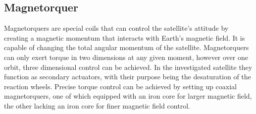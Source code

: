 \subsection{Magnetorquer}

Magnetorquers are special coils that can control the satellite's attitude by creating a magnetic momentum that interacts with Earth's magnetic field. It is capable of changing the total angular momentum of the satellite. Magnetorquers can only exert torque in two dimensions at any given moment, however over one orbit, three dimensional control can be achieved. In the investigated satellite they function as secondary actuators, with their purpose being the desaturation of the reaction wheels. Precise torque control can be achieved by setting up coaxial magnetorquers, one of which equipped with an iron core for larger magnetic field, the other lacking an iron core for finer magnetic field control.